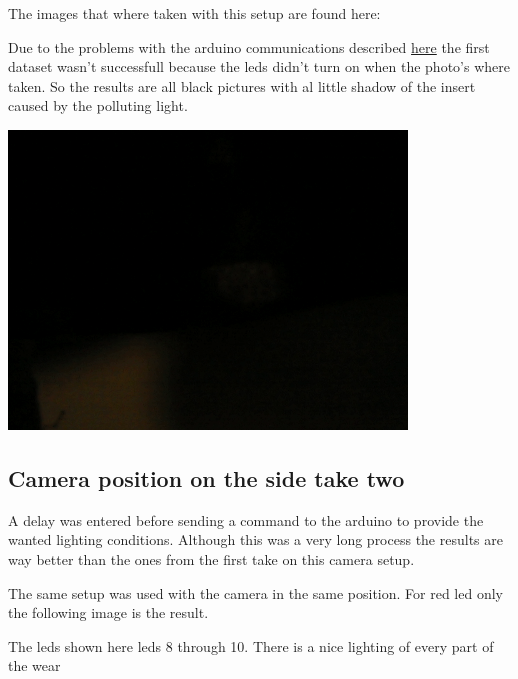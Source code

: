 \documentclass{scrartcl}
\begin{document}
The images that where taken with this setup are found here:

Due to the problems with the arduino communications described \href{../../../../Code/Problems/arduino_loop_time.tex}{here} the first dataset wasn't successfull because the leds didn't turn on when the photo's where taken. So the results are all black pictures with al little shadow of the insert caused by the polluting light. 



\includegraphics[width=4.166667in, keepaspectratio=true]{./1_camera_position_side/p3_l6_black.png}



\subsection{Camera position on the side take two}



A delay was entered before sending a command to the arduino to provide the wanted lighting conditions. Although this was a very long process the results are way better than the ones from the first take on this camera setup. 



The same setup was used with the camera in the same position. For red led only the following image is the result.



The leds shown here leds 8 through 10. There is a nice lighting of every part of the wear
\end{document}
